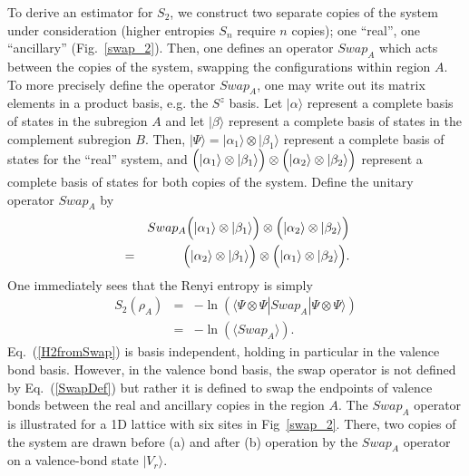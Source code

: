 \documentclass[prl,aps,twocolumn,floatfix,amsmath,amssymb,superscriptaddress,tightenlines]{revtex4}
\begin{document}
To derive an estimator for $S_2$, we construct two separate copies of the
system under consideration (higher entropies $S_n$ require $n$ copies); one ``real'', one ``ancillary'' (Fig.~\ref{swap_2}).
Then, one defines an
operator $Swap_A$ which acts between the copies of the system, swapping the
configurations within region $A$.  To more precisely define the operator
$Swap_A$, one may write out its matrix elements in a product basis, e.g. the $S^z$ basis.
Let $|\alpha\rangle$  represent a complete basis of states in the subregion
$A$ and let $|\beta\rangle$ represent a complete basis of states in
the complement subregion $B$.  Then, $|\Psi \rangle =|\alpha_1 \rangle \otimes |\beta_1 \rangle$ represent
a complete basis of states for the ``real'' system, and
$\Bigl( |\alpha_1\rangle \otimes |\beta_1\rangle \Bigr) \otimes
\Bigl( |\alpha_2\rangle \otimes |\beta_2\rangle \Bigr)$
represent a complete basis of states for both copies of the system.
Define the unitary operator $Swap_A$ by
\begin{eqnarray}
\label{SwapDef}
&& Swap_A \Bigl( |\alpha_1\rangle \otimes |\beta_1\rangle \Bigr) \otimes
\Bigl( |\alpha_2\rangle \otimes |\beta_2\rangle \Bigr) \nonumber \\ &=&
\Bigl( |\alpha_2\rangle \otimes |\beta_1\rangle \Bigr) \otimes
\Bigl( |\alpha_1\rangle \otimes |\beta_2\rangle \Bigr).
\end{eqnarray}
One immediately sees that the Renyi entropy is simply
\begin{eqnarray}
\label{H2fromSwap}
S_2(\rho_A) &=&-\ln(\langle \Psi\otimes \Psi|Swap_A|\Psi\otimes \Psi\rangle) 
\nonumber
\\
&=&-\ln(\langle Swap_A \rangle). \label{s2}
\end{eqnarray}
Eq.~(\ref{H2fromSwap}) is basis independent, holding in particular in the valence
bond basis.  However, in the valence bond basis, the swap operator is
not defined by Eq.~(\ref{SwapDef}) but rather it is defined to
swap the endpoints of valence bonds between the real and ancillary copies in the region $A$.
The $Swap_A$ operator is illustrated for a 1D lattice with six sites in Fig~\ref{swap_2}.  
There, two copies of the system are drawn before (a) and after (b) operation by the $Swap_A$ operator on a
valence-bond state $|V_r\rangle$.
\end{document}
